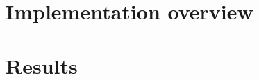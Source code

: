 \documentclass[../Master.tex]{subfiles}
\begin{document}
\providecommand{\master}{..}
\section{Implementation overview}


%    

\section{Results}\label{sec:Impl:Results}
    
\end{document}
